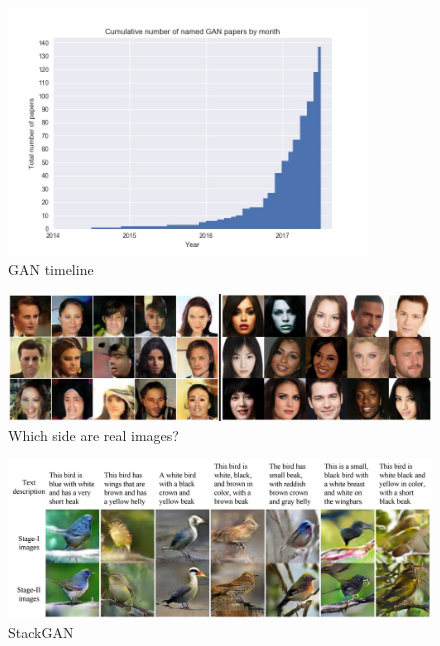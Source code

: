 \documentclass{beamer}
\begin{document}

\begin{frame}
\begin{figure}[h!]
	\centering
	\includegraphics[width=0.85\textwidth]{gan_timeline.jpg}
	\caption{GAN timeline}
	\label{fig:gan_timeline}
\end{figure}

\end{frame}


\begin{frame}
\begin{figure}[h!]
	\centering
	\includegraphics[width=\textwidth]{which_is_real.png}
	\caption{Which side are real images?}
	\label{fig:which_is_real}
\end{figure}
\end{frame}


\begin{frame}
\begin{figure}[h!]
	\centering
	\includegraphics[width=\textwidth]{stack_gan.jpg}
	\caption{StackGAN}
\end{figure}
\end{frame}
\end{document}
